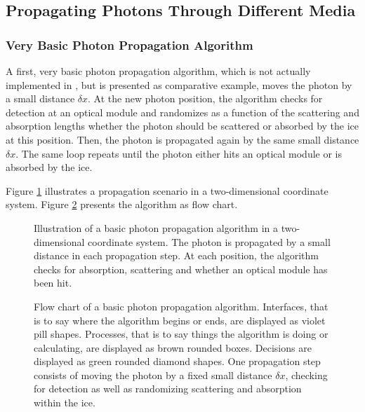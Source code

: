 
\subsection{Propagating Photons Through Different Media}

\subsubsection{Very Basic Photon Propagation Algorithm}

A first, very basic photon propagation algorithm, which is not actually implemented in \clsim, but is presented as comparative example, moves the photon by a small distance $\delta x$. At the new photon position, the algorithm checks for detection at an optical module and randomizes as a function of the scattering and absorption lengths whether the photon should be scattered or absorbed by the ice at this position. Then, the photon is propagated again by the same small distance $\delta x$. The same loop repeats until the photon either hits an optical module or is absorbed by the ice.

Figure \ref{fig:ieph6Bie} illustrates a propagation scenario in a two-dimensional coordinate system. Figure \ref{fig:ohsa0miG} presents the algorithm as flow chart.

\begin{figure}[htb]
  \caption{Illustration of a basic photon propagation algorithm in a two-dimensional coordinate system. The photon is propagated by a small distance in each propagation step. At each position, the algorithm checks for absorption, scattering and whether an optical module has been hit.}
  \label{fig:ieph6Bie}
\end{figure}

\begin{figure}[p]
  \caption{Flow chart of a basic photon propagation algorithm. Interfaces, that is to say where the algorithm begins or ends, are displayed as violet pill shapes. Processes, that is to say things the algorithm is doing or calculating, are displayed as brown rounded boxes. Decisions are displayed as green rounded diamond shapes. One propagation step consists of moving the photon by a fixed small distance $\delta x$, checking for detection as well as randomizing scattering and absorption within the ice.}
  \label{fig:ohsa0miG}
\end{figure}

